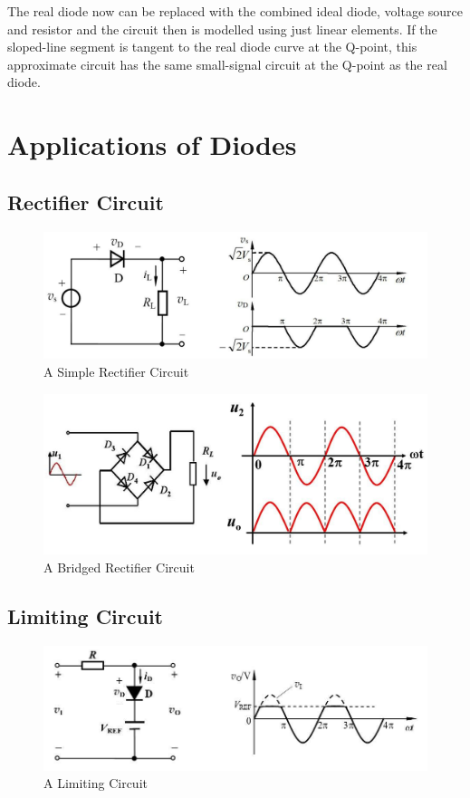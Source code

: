 The real diode now can be replaced with the combined ideal diode, voltage source and resistor and the circuit then is modelled using just linear elements. If the sloped-line segment is tangent to the real diode curve at the Q-point, this approximate circuit has the same small-signal circuit at the Q-point as the real diode.

\section{Applications of Diodes}

\subsection{Rectifier Circuit}

\begin{figure}[H]
  \centering
  \includegraphics[width=0.9\linewidth]{figures/RectifierCircuit}
  \caption{A Simple Rectifier Circuit}
  \label{fig:}
\end{figure}
\begin{figure}[H]
  \centering
  \includegraphics[width=0.9\linewidth]{figures/BridgedRectifierCircuit}
  \caption{A Bridged Rectifier Circuit}
  \label{fig:}
\end{figure}

\subsection{Limiting Circuit}

\begin{figure}[H]
  \centering
  \includegraphics[width=0.9\linewidth]{figures/LimitingCircuit}
  \caption{A Limiting Circuit}
  \label{fig:}
\end{figure}

